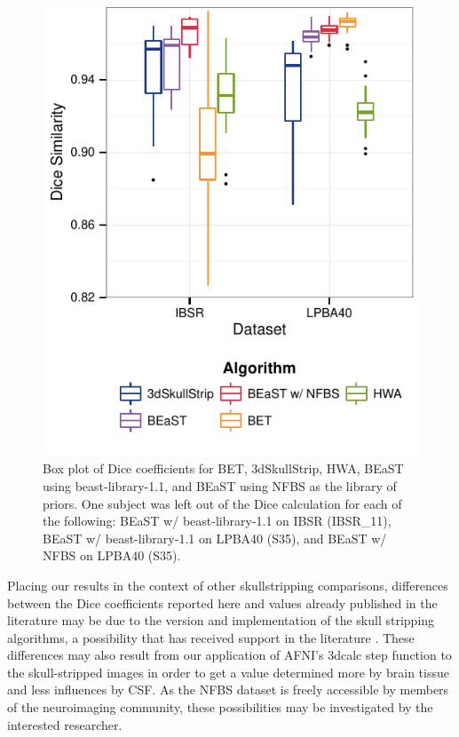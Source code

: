 \documentclass{bmcart}
\begin{document}
\begin{figure}[ht!]
\includegraphics[]{boxplot_IL.pdf}
    \caption{
Box plot of Dice coefficients for BET, 3dSkullStrip, HWA, BEaST using beast-library-1.1, and BEaST using NFBS as the library of priors. One subject was left out of the Dice calculation for each of the following: BEaST w/ beast-library-1.1 on IBSR (IBSR\_11), BEaST w/ beast-library-1.1 on LPBA40 (S35), and BEaST w/ NFBS on LPBA40 (S35).}
    \label{fig:boxplot_I&L}
\end{figure}

Placing our results in the context of other skullstripping comparisons, differences between the Dice coefficients reported here and values already published in the literature may be due to the version and implementation of the skull stripping algorithms, a possibility that has received support in the literature \cite{Iglesias2011}. These differences may also result from our application of AFNI's 3dcalc step function to the skull-stripped images in order to get a value determined more by brain tissue and less influences by CSF. As the NFBS dataset is freely accessible by members of the neuroimaging community, these possibilities may be investigated by the interested researcher.
    
\end{document}
